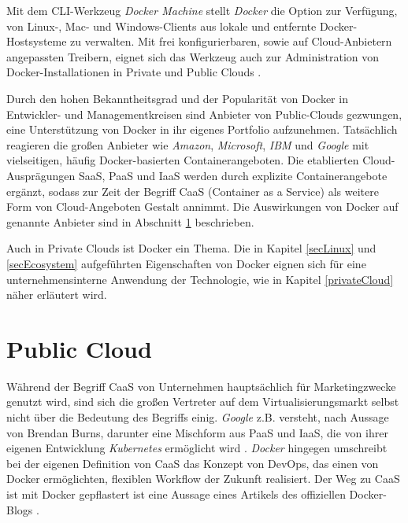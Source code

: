 \documentclass[../main.tex]{subfiles}
\begin{document}
  Mit dem CLI-Werkzeug \emph{Docker Machine} stellt \emph{Docker} die Option zur Verfügung, von Linux-, Mac- und Windows-Clients aus lokale und entfernte Docker-Hostsysteme zu verwalten. Mit frei konfigurierbaren, sowie auf Cloud-Anbietern angepassten Treibern, eignet sich das Werkzeug auch zur Administration von Docker-Installationen in Private und Public Clouds \cite{dockerMachineOverview}\cite{dockerMachineDriverGeneric}\cite{dockerMachineOverviewCloud}.

  Durch den hohen Bekanntheitsgrad und der Popularität von Docker in Entwickler- und Managementkreisen sind Anbieter von Public-Clouds gezwungen, eine Unterstützung von Docker in ihr eigenes Portfolio aufzunehmen. Tatsächlich reagieren die großen Anbieter wie \emph{Amazon}, \emph{Microsoft}, \emph{IBM} und \emph{Google} mit vielseitigen, häufig Docker-basierten Containerangeboten. Die etablierten Cloud-Ausprägungen SaaS, PaaS und IaaS werden durch explizite Containerangebote ergänzt, sodass zur Zeit der Begriff CaaS (Container as a Service) als weitere Form von Cloud-Angeboten Gestalt annimmt. Die Auswirkungen von Docker auf genannte Anbieter sind in Abschnitt \ref{publicCloud} beschrieben.

  Auch in Private Clouds ist Docker ein Thema. Die in Kapitel \ref{secLinux} und \ref{secEcosystem} aufgeführten Eigenschaften von Docker eignen sich für eine unternehmensinterne Anwendung der Technologie, wie in Kapitel \ref{privateCloud} näher erläutert wird.


  \section{Public Cloud}
  \label{publicCloud}
    Während der Begriff CaaS von Unternehmen hauptsächlich für Marketingzwecke genutzt wird, sind sich die großen Vertreter auf dem Virtualisierungsmarkt selbst nicht über die Bedeutung des Begriffs einig. \emph{Google} z.B. versteht, nach Aussage von Brendan Burns, darunter eine Mischform aus PaaS und IaaS, die von ihrer eigenen Entwicklung \emph{Kubernetes} ermöglicht wird \cite[S.12]{slideshareContainerKubernetes}.
    \emph{Docker} hingegen umschreibt bei der eigenen Definition von CaaS das Konzept von DevOps, das einen von Docker ermöglichten, flexiblen Workflow der Zukunft realisiert. \glqq{}Der Weg zu CaaS ist mit Docker gepflastert\grqq{} ist eine Aussage eines Artikels des offiziellen Docker-Blogs \cite{dockerCAAS}.
\end{document}
